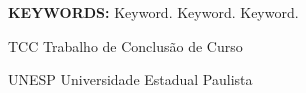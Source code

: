 \documentclass[
  12pt,		%
  a4paper,	%
  openright,%
  oneside,	%
  chapter=TITLE,		%
  section=TITLE,		%
  english,	%
  french,	%
  spanish,	%
  brazil
]{abntex2}
\begin{document}
    \begin{resumo}[Abstract] %
    
        \lipsum[1] %
        
        \vspace*{0.5cm}
        
        \noindent\textbf{\MakeUppercase{Keywords: }} Keyword. Keyword. Keyword.
    
    \end{resumo}
    
    
    \listoffigures*
    \newpage
    
    
    \listoftables*
    \newpage
    
    
    \begin{siglas}
        \item[TCC] Trabalho de Conclusão de Curso
        \item[UNESP] Universidade Estadual Paulista
    \end{siglas}
    
\end{document}
